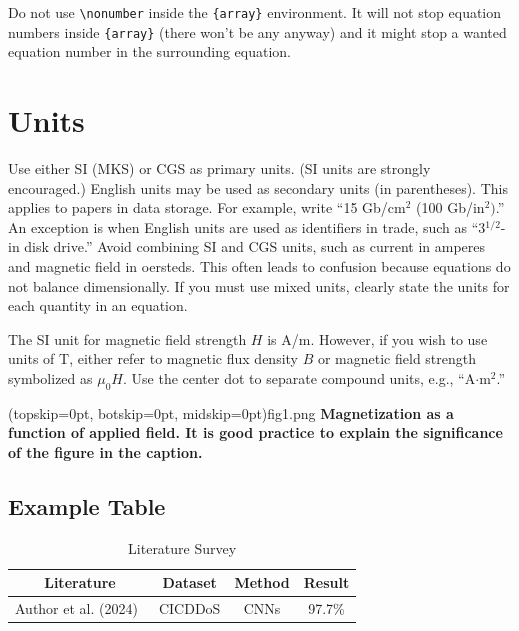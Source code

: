 \documentclass{ieeeaccess}
\begin{document}
Do not use \verb|\nonumber| inside the \verb|{array}| environment. It
will not stop equation numbers inside \verb|{array}| (there won't be
any anyway) and it might stop a wanted equation number in the
surrounding equation.

\section{Units}
Use either SI (MKS) or CGS as primary units. (SI units are strongly
encouraged.) English units may be used as secondary units (in parentheses).
This applies to papers in data storage. For example, write ``15
Gb/cm$^{2}$ (100 Gb/in$^{2})$.'' An exception is when
English units are used as identifiers in trade, such as ``3$^{1\!/\!2}$-in
disk drive.'' Avoid combining SI and CGS units, such as current in amperes
and magnetic field in oersteds. This often leads to confusion because
equations do not balance dimensionally. If you must use mixed units, clearly
state the units for each quantity in an equation.

The SI unit for magnetic field strength $H$ is A/m. However, if you wish to use
units of T, either refer to magnetic flux density $B$ or magnetic field
strength symbolized as $\mu _{0}H$. Use the center dot to separate
compound units, e.g., ``A$\cdot $m$^{2}$.''


\Figure[t!](topskip=0pt, botskip=0pt, midskip=0pt){fig1.png}
{ \textbf{Magnetization as a function of applied field.
It is good practice to explain the significance of the figure in the caption.}
\label{fig1}}

\subsection{Example Table}

\begin{table}[t!]
\centering
\begin{tabular}{|c|c|c|c|}
\hline
\textbf{Literature} & \textbf{Dataset} & \textbf{Method} & \textbf{Result} \\
\hline
Author et al. (2024)~\cite{chandio2022precise} & CICDDoS\-2019 & CNNs & 97.7\% \\
\hline
\end{tabular}
\caption{Literature Survey}
\label{tab:my_label}
\end{table}
\end{document}
